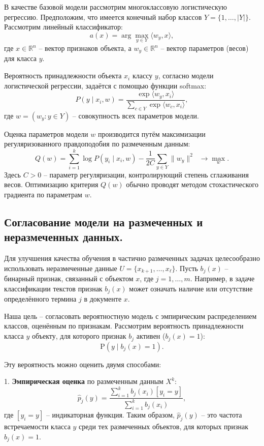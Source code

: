 В качестве базовой модели рассмотрим многоклассовую логистическую регрессию. Предположим, что имеется конечный набор классов $Y = \{1, \ldots, |Y|\}$. Рассмотрим линейный классификатор:
\[
a(x) = \arg \max_{y \in Y} \langle w_y, x \rangle, 
\]
где $x \in \mathbb{R}^n$ – вектор признаков объекта, а $w_y \in \mathbb{R}^n$ – вектор параметров (весов) для класса $y$.

Вероятность принадлежности объекта $x_i$ классу $y$, согласно модели логистической регрессии, задаётся с помощью функции softmax:
\[
P(y \mid x_i, w) = \frac{\exp\langle w_y, x_i \rangle}{\sum_{c \in Y} \exp\langle w_c, x_i \rangle},
\]
где $w = (w_y: y \in Y)$ – совокупность всех параметров модели.

Оценка параметров модели $w$ производится путём максимизации регуляризованного правдоподобия по размеченным данным:
\[
Q(w) = \sum_{i=1}^k \log P(y_i \mid x_i, w) - \frac{1}{2C}\sum_{y \in Y}\|w_y\|^2 \;\; \to \max_w.
\]
Здесь $C > 0$ – параметр регуляризации, контролирующий степень сглаживания весов. Оптимизацию критерия $Q(w)$ обычно проводят методом стохастического градиента по параметрам $w$.

\subsection{Согласование модели на размеченных и неразмеченных данных.}

Для улучшения качества обучения в частично размеченных задачах целесообразно использовать неразмеченные данные $U = \{x_{k+1}, \ldots, x_{\ell}\}$. Пусть $b_j(x)$ – бинарный признак, связанный с объектом $x$, где $j = 1, \ldots, m$. Например, в задаче классификации текстов признак $b_j(x)$ может означать наличие или отсутствие определённого термина $j$ в документе $x$. 

Наша цель – согласовать вероятностную модель с эмпирическим распределением классов, оценённым по признакам. Рассмотрим вероятность принадлежности класса $y$ объекту, для которого признак $b_j$ активен ($b_j(x)=1$):
\[
\mathrm{P}(y \mid b_j(x)=1).
\]

Эту вероятность можно оценить двумя способами:

1. \textbf{Эмпирическая оценка} по размеченным данным $X^k$:
\[
\hat{p}_j(y) = \frac{\sum_{i=1}^k b_j(x_i)[y_i = y]}{\sum_{i=1}^k b_j(x_i)},
\]
где $[y_i = y]$ – индикаторная функция. Таким образом, $\hat{p}_j(y)$ – это частота встречаемости класса $y$ среди тех размеченных объектов, для которых признак $b_j(x)=1$.

